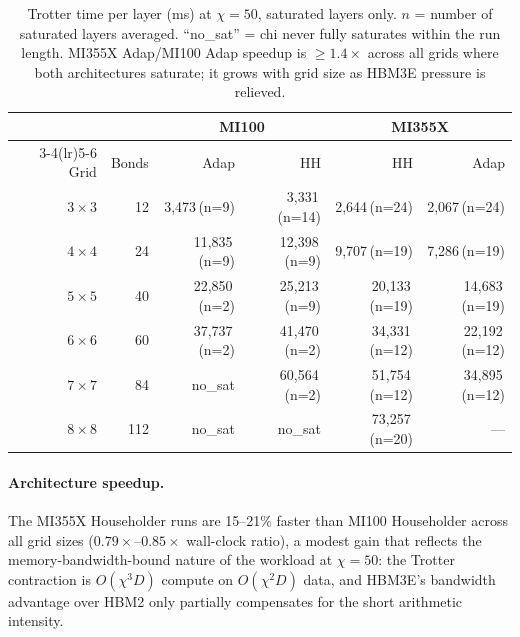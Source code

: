 \documentclass[11pt]{article}
\begin{document}
\begin{table}[ht]
\centering
\caption{Trotter time per layer (ms) at $\chi=50$, saturated layers only.
  $n$ = number of saturated layers averaged.
  ``no\_sat'' = chi never fully saturates within the run length.
  MI355X Adap/MI100 Adap speedup is $\geq 1.4\times$ across all grids where both
  architectures saturate; it grows with grid size as HBM3E pressure is relieved.}
\label{tab:grid_scaling_mi355x}
\smallskip
\small
\begin{tabular}{r r rr rr}
\toprule
& & \multicolumn{2}{c}{MI100} & \multicolumn{2}{c}{MI355X} \\
\cmidrule(lr){3-4}\cmidrule(lr){5-6}
Grid & Bonds & Adap & HH & HH & Adap \\
\midrule
$3\times3$  & 12  & 3{,}473\,(n=9)  & 3{,}331\,(n=14) & 2{,}644\,(n=24) & 2{,}067\,(n=24) \\
$4\times4$  & 24  & 11{,}835\,(n=9) & 12{,}398\,(n=9) & 9{,}707\,(n=19) & 7{,}286\,(n=19) \\
$5\times5$  & 40  & 22{,}850\,(n=2) & 25{,}213\,(n=9) & 20{,}133\,(n=19)& 14{,}683\,(n=19)\\
$6\times6$  & 60  & 37{,}737\,(n=2) & 41{,}470\,(n=2) & 34{,}331\,(n=12)& 22{,}192\,(n=12)\\
$7\times7$  & 84  & no\_sat         & 60{,}564\,(n=2) & 51{,}754\,(n=12)& 34{,}895\,(n=12)\\
$8\times8$  & 112 & no\_sat         & no\_sat         & 73{,}257\,(n=20)& ---            \\
\bottomrule
\end{tabular}
\end{table}

\paragraph{Architecture speedup.}
The MI355X Householder runs are 15--21\% faster than MI100 Householder across all
grid sizes ($0.79\times$--$0.85\times$ wall-clock ratio), a modest gain that
reflects the memory-bandwidth-bound nature of the workload at $\chi=50$: the
Trotter contraction is $O(\chi^3 D)$ compute on $O(\chi^2 D)$ data, and HBM3E's
bandwidth advantage over HBM2 only partially compensates for the short arithmetic
intensity.
\end{document}
